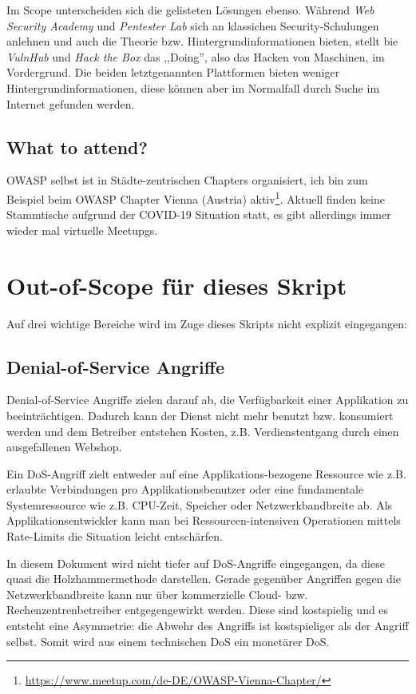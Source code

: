 Im Scope unterscheiden sich die gelisteten Lösungen ebenso. Während \textit{Web Security Academy} und \textit{Pentester Lab} sich an klassichen Security-Schulungen anlehnen und auch die Theorie bzw. Hintergrundinformationen bieten, stellt bie \textit{VulnHub} und \textit{Hack the Box} das ,,Doing'', also das Hacken von Maschinen, im Vordergrund. Die beiden letztgenannten Plattformen bieten weniger Hintergrundinformationen, diese können aber im Normalfall durch Suche im Internet gefunden werden.

\subsection{What to attend?}

OWASP selbst ist in Städte-zentrischen Chapters organisiert, ich bin zum Beispiel beim OWASP Chapter Vienna (Austria) aktiv\footnote{\url{https://www.meetup.com/de-DE/OWASP-Vienna-Chapter/}}. Aktuell finden keine Stammtische aufgrund der COVID-19 Situation statt, es gibt allerdings immer wieder mal virtuelle Meetupgs.

\section{Out-of-Scope für dieses Skript}

Auf drei wichtige Bereiche wird im Zuge dieses Skripts nicht explizit eingegangen:

\subsection{Denial-of-Service Angriffe}

Denial-of-Service Angriffe zielen darauf ab, die Verfügbarkeit einer Applikation zu beeinträchtigen. Dadurch kann der Dienst nicht mehr benutzt bzw. konsumiert werden und dem Betreiber entstehen Kosten, z.B. Verdienstentgang durch einen ausgefallenen Webshop.

Ein DoS-Angriff zielt entweder auf eine Applikations-bezogene Ressource wie z.B. erlaubte Verbindungen pro Applikationsbenutzer oder eine fundamentale Systemressource wie z.B. CPU-Zeit, Speicher oder Netzwerkbandbreite ab. Als Applikationsentwickler kann man bei Ressourcen-intensiven Operationen mittels Rate-Limits die Situation leicht entschärfen.

In diesem Dokument wird nicht tiefer auf DoS-Angriffe eingegangen, da diese quasi die Holzhammermethode darstellen. Gerade gegenüber Angriffen gegen die Netzwerkbandbreite kann nur über kommerzielle Cloud- bzw. Rechenzentrenbetreiber entgegengewirkt werden. Diese sind kostspielig und es entsteht eine Asymmetrie: die Abwehr des Angriffs ist kostspieliger als der Angriff selbst. Somit wird aus einem technischen DoS ein monetärer DoS.

